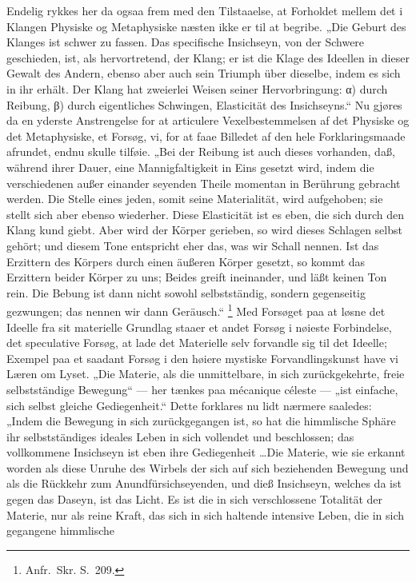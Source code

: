 \documentclass[12pt]{book}
\newcommand{\opage}[1]{\marginnote{\footnotesize\textit{[#1]}}}
\begin{document}
Endelig rykkes her da ogsaa frem med den Tilstaaelse, at Forholdet mellem det i Klangen
Physiske og Metaphysiske næsten ikke er til at begribe. „Die Geburt des Klanges ist schwer zu
fassen. Das specifische Insichseyn, von der Schwere geschieden, ist, als hervortretend, der
Klang; er ist die Klage des Ideellen in dieser Gewalt des Andern, ebenso aber auch sein
Triumph über dieselbe, indem es sich in ihr erhält. Der Klang hat zweierlei Weisen seiner
Hervorbringung: α) durch Reibung, β) durch eigentliches Schwingen, Elasticität des
Insichseyns.“ Nu gjøres da en yderste Anstrengelse for at articulere Vexelbestemmelsen af det
Physiske og det Metaphysiske, et Forsøg, vi, for at faae Billedet af den hele
Forklaringsmaade afrundet, endnu skulle tilføie. „Bei der Reibung ist auch dieses vorhanden,
daß, während ihrer Dauer, eine Mannigfaltigkeit in Eins gesetzt wird, indem die verschiedenen
außer einander seyenden Theile momentan in Berührung gebracht werden. Die Stelle eines jeden,
somit seine Materialität, wird aufgehoben; sie stellt sich aber ebenso wiederher. Diese
Elasticität ist es eben, die sich durch den Klang kund giebt. Aber wird der Körper gerieben,
so wird dieses Schlagen selbst gehört; und diesem Tone entspricht eher das, was wir Schall
nennen. Ist das Erzittern des Körpers durch einen äußeren Körper gesetzt, so kommt das
Erzittern beider Körper zu uns; Beides greift ineinander, und läßt keinen Ton rein. Die
Bebung ist dann nicht sowohl selbstständig, sondern gegenseitig gezwungen; das nennen wir dann
Geräusch.“%
\footnote{Anfr.\ Skr. S.~209.}
\opage{374} Med Forsøget paa at løsne det Ideelle fra sit materielle Grundlag staaer et andet Forsøg i
nøieste Forbindelse, det speculative Forsøg, at lade det Materielle selv forvandle sig til det
Ideelle; Exempel paa et saadant Forsøg i den høiere mystiske Forvandlingskunst have vi Læren
om Lyset. „Die Materie, als die unmittelbare, in sich zurückgekehrte, freie selbstständige
Bewegung“ — her tænkes paa mécanique céleste — „ist einfache, sich selbst gleiche
Gediegenheit.“ Dette forklares nu lidt nærmere saaledes: „Indem die Bewegung in sich
zurückgegangen ist, so hat die himmlische Sphäre ihr selbstständiges ideales Leben in sich
vollendet und beschlossen; das vollkommene Insichseyn ist eben ihre Gediegenheit \ldots Die
Materie, wie sie erkannt worden als diese Unruhe des Wirbels der sich auf sich beziehenden
Bewegung und als die Rückkehr zum Anundfürsichseyenden, und dieß Insichseyn, welches da ist
gegen das Daseyn, ist das Licht. Es ist die in sich verschlossene Totalität der Materie, nur
als reine Kraft, das sich in sich haltende intensive Leben, die in sich gegangene himmlische
\end{document}

